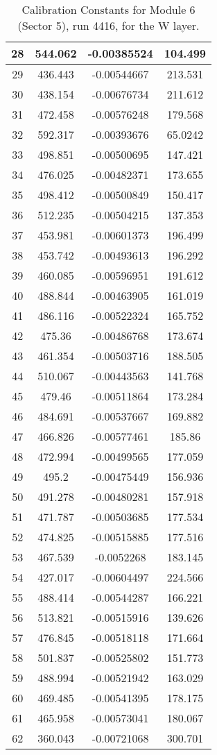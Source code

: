 \begin{table}[h]
{\begin{tabular}{|c|c|c|c|}
28	&	544.062	&	-0.00385524	&	104.499	\\	\hline
29	&	436.443	&	-0.00544667	&	213.531	\\	\hline
30	&	438.154	&	-0.00676734	&	211.612	\\	\hline
31	&	472.458	&	-0.00576248	&	179.568	\\	\hline
32	&	592.317	&	-0.00393676	&	65.0242	\\	\hline
33	&	498.851	&	-0.00500695	&	147.421	\\	\hline
34	&	476.025	&	-0.00482371	&	173.655	\\	\hline
35	&	498.412	&	-0.00500849	&	150.417	\\	\hline
36	&	512.235	&	-0.00504215	&	137.353	\\	\hline
37	&	453.981	&	-0.00601373	&	196.499	\\	\hline
38	&	453.742	&	-0.00493613	&	196.292	\\	\hline
39	&	460.085	&	-0.00596951	&	191.612	\\	\hline
40	&	488.844	&	-0.00463905	&	161.019	\\	\hline
41	&	486.116	&	-0.00522324	&	165.752	\\	\hline
42	&	475.36	&	-0.00486768	&	173.674	\\	\hline
43	&	461.354	&	-0.00503716	&	188.505	\\	\hline
44	&	510.067	&	-0.00443563	&	141.768	\\	\hline
45	&	479.46	&	-0.00511864	&	173.284	\\	\hline
46	&	484.691	&	-0.00537667	&	169.882	\\	\hline
47	&	466.826	&	-0.00577461	&	185.86	\\	\hline
48	&	472.994	&	-0.00499565	&	177.059	\\	\hline
49	&	495.2	&	-0.00475449	&	156.936	\\	\hline
50	&	491.278	&	-0.00480281	&	157.918	\\	\hline
51	&	471.787	&	-0.00503685	&	177.534	\\	\hline
52	&	474.825	&	-0.00515885	&	177.516	\\	\hline
53	&	467.539	&	-0.0052268	&	183.145	\\	\hline
54	&	427.017	&	-0.00604497	&	224.566	\\	\hline
55	&	488.414	&	-0.00544287	&	166.221	\\	\hline
56	&	513.821	&	-0.00515916	&	139.626	\\	\hline
57	&	476.845	&	-0.00518118	&	171.664	\\	\hline
58	&	501.837	&	-0.00525802	&	151.773	\\	\hline
59	&	488.994	&	-0.00521942	&	163.029	\\	\hline
60	&	469.485	&	-0.00541395	&	178.175	\\	\hline
61	&	465.958	&	-0.00573041	&	180.067	\\	\hline
62	&	360.043	&	-0.00721068	&	300.701	\\	\hline
              \end{tabular}
        }
        \caption{Calibration Constants for Module 6 (Sector 5), run 4416, for the W layer.}
\end{table}

